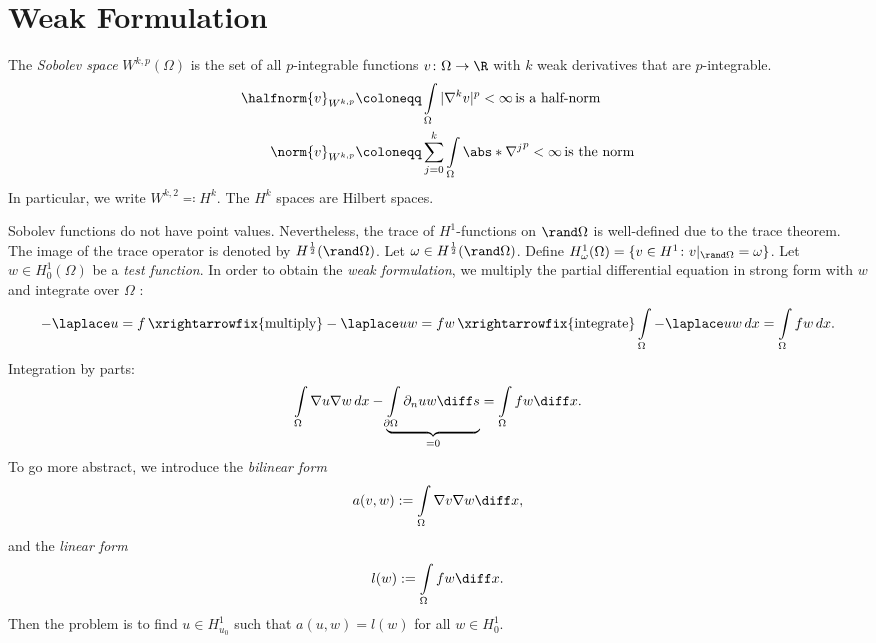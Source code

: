 \section{Weak Formulation}
\begin{definition}
The \textit{Sobolev space} $W^{k,p}(\Omega)$ is the set of all $p$-integrable functions $v\colon\Omega\to\R$ with $k$ weak derivatives that are $p$-integrable.
\begin{align*}
  \halfnorm{v}_{W^{k,p}} &\coloneqq \int\limits_\Omega|\nabla^kv|^p<\infty\,\text{is a half-norm} \\
  \norm{v}_{W^{k,p}} &\coloneqq \sum_{j=0}^k \int\limits_\Omega \abs*{\nabla^j}^p < \infty\, \text{is the norm}
\end{align*}
In particular, we write $W^{k,2}\eqqcolon H^k$. The $H^k$ spaces are Hilbert spaces.
\end{definition}
Sobolev functions do not have point values. Nevertheless, the trace of $H^1$-functions on $\rand\Omega$ is well-defined due to the trace theorem. The image of the trace operator is denoted by $H^{\frac{1}{2}}(\rand\Omega)$. Let $\omega\in H^{\frac{1}{2}}(\rand\Omega)$. Define $H_\omega^1(\Omega)=\{ v\in H^1\colon v|_{\rand\Omega}=\omega\}$. Let $w\in H_0^1(\Omega)$ be a \textit{test function}. In order to obtain the \textit{weak formulation}, we multiply the partial differential equation in strong form with $w$ and integrate over $\Omega$ :
\begin{equation*}
    -\laplace u=f\, \xrightarrowfix{\text{multiply}}-\laplace uw=fw\,\xrightarrowfix{\text{integrate}}\int\limits_\Omega-\laplace uw\,dx=\int\limits_\Omega fw\,dx.
\end{equation*}
Integration by parts:
\begin{equation*}
    \int\limits_\Omega\nabla u\nabla w\,dx-\underbrace{\int\limits_{\partial\Omega}\partial_{n}uw \diff s}_{=0}=\int\limits_\Omega fw\diff x.
\end{equation*}
To go more abstract, we introduce the \textit{bilinear form}
\begin{equation*}
    a(v,w):=\int\limits_\Omega\nabla v\nabla w\diff x,
\end{equation*}
and the \textit{linear form}
\begin{equation*}
    l(w):=\int\limits_\Omega fw\diff x.
\end{equation*}
Then the problem is to find $u\in H_{u_0}^1$ such that $a(u,w)=l(w)$ for all $w\in H_0^1$.
